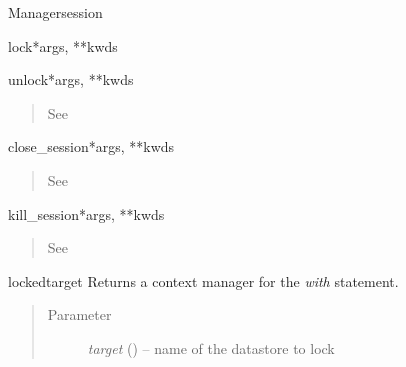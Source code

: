 \documentclass[a4paper,10pt,english]{manual}
\begin{document}
\begin{classdesc}{Manager}{session}
\begin{methoddesc}{lock}{*args, **kwds}
\begin{quote}
\begin{description}
\end{description}\end{quote}
\end{methoddesc}

\hypertarget{ncclient.manager.Manager.unlock}{}\begin{methoddesc}{unlock}{*args, **kwds}~\begin{quote}\begin{description}
\item[See]
\hyperlink{ncclient.operations.Unlock.request}{}

\end{description}\end{quote}
\end{methoddesc}

\hypertarget{ncclient.manager.Manager.close_session}{}\begin{methoddesc}{close\_session}{*args, **kwds}~\begin{quote}\begin{description}
\item[See]

\end{description}\end{quote}
\end{methoddesc}

\hypertarget{ncclient.manager.Manager.kill_session}{}\begin{methoddesc}{kill\_session}{*args, **kwds}~\begin{quote}\begin{description}
\item[See]

\end{description}\end{quote}
\end{methoddesc}

\hypertarget{ncclient.manager.Manager.locked}{}\begin{methoddesc}{locked}{target}
Returns a context manager for the \emph{with} statement.
\begin{quote}\begin{description}
\item[Parameter]
\emph{target} (\href{http://docs.python.org/library/string.html\#string}{}) -- name of the datastore to lock


\end{description}
\end{quote}
\end{methoddesc}
\end{classdesc}
\end{document}
